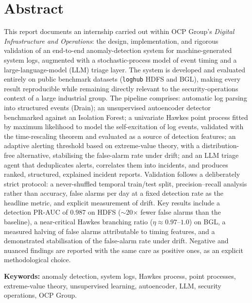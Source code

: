 \documentclass[11pt,a4paper]{report}
\newcommand{\code}[1]{\texttt{\small #1}}
\begin{document}
\chapter*{Abstract}
This report documents an internship carried out within OCP Group's
\emph{Digital Infrastructure and Operations}: the design, implementation, and
rigorous validation of an end-to-end anomaly-detection system for
machine-generated system logs, augmented with a stochastic-process model of
event timing and a large-language-model (LLM) triage layer. The system is
developed and evaluated entirely on public benchmark datasets (\code{loghub}
HDFS and BGL), making every result reproducible while remaining directly
relevant to the security-operations context of a large industrial group. The
pipeline comprises: automatic log parsing into structured events (Drain); an
unsupervised autoencoder detector benchmarked against an Isolation Forest;
a univariate Hawkes point process fitted by maximum likelihood to model the
self-excitation of log events, validated with the time-rescaling theorem and
evaluated as a source of detection features; an adaptive alerting threshold
based on extreme-value theory, with a distribution-free alternative,
stabilising the false-alarm rate under drift; and an LLM triage agent that
deduplicates alerts, correlates them into incidents, and produces ranked,
structured, explained incident reports. Validation follows a deliberately
strict protocol: a never-shuffled temporal train/test split, precision--recall
analysis rather than accuracy, false alarms per day at a fixed detection rate
as the headline metric, and explicit measurement of drift. Key results
include a detection PR-AUC of $0.987$ on HDFS ($\sim$20$\times$ fewer false
alarms than the baseline), a near-critical Hawkes branching ratio
($\eta\approx0.97$--$1.0$) on BGL, a measured halving of false alarms
attributable to timing features, and a demonstrated stabilisation of the
false-alarm rate under drift. Negative and nuanced findings are reported with
the same care as positive ones, as an explicit methodological choice.

\vspace{0.4em}
\noindent\textbf{Keywords:} anomaly detection, system logs, Hawkes process,
point processes, extreme-value theory, unsupervised learning, autoencoder,
LLM, security operations, OCP Group.
\end{document}
